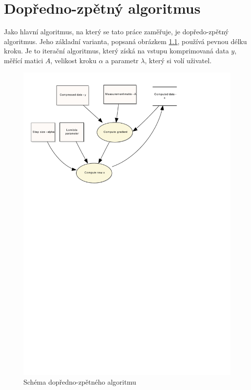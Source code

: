 \documentclass[FM,BP]{tulthesis}
\begin{document}
\chapter{Dopředno-zpětný algoritmus}
Jako hlavní algoritmus, na který se tato práce zaměřuje, je dopředo-zpětný algoritmus. Jeho základní varianta, popsaná obrázkem \ref{fig:fw-bw alg}, používá pevnou délku kroku. Je to iterační algoritmus, který získá na vstupu komprimovaná data $y$, měřící matici $A$, velikost kroku $\alpha$ a parametr $\lambda$, který si volí uživatel.
\begin{figure}[!h]
\begin{center}
\includegraphics[scale=0.7]{obr/forwardbackward.pdf}
\end{center}
\caption{Schéma dopředno-zpětného algoritmu}
\label{fig:fw-bw alg}
\end{figure}
\end{document}
